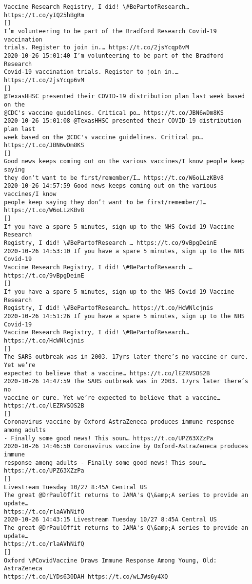 \documentclass[11pt]{article}
\begin{document}
\begin{Verbatim}[commandchars=\\\{\}]
Vaccine Research Registry, I did! \#BePartofResearch… https://t.co/yIQ25hBgRm
[]
I’m volunteering to be part of the Bradford Research Covid-19 vaccination
trials. Register to join in.… https://t.co/2jsYcqp6vM
2020-10-26 15:01:40 I’m volunteering to be part of the Bradford Research
Covid-19 vaccination trials. Register to join in.… https://t.co/2jsYcqp6vM
[]
@TexasHHSC presented their COVID-19 distribution plan last week based on the
@CDC's vaccine guidelines. Critical po… https://t.co/JBN6wDm8KS
2020-10-26 15:01:08 @TexasHHSC presented their COVID-19 distribution plan last
week based on the @CDC's vaccine guidelines. Critical po…
https://t.co/JBN6wDm8KS
[]
Good news keeps coming out on the various vaccines/I know people keep saying
they don’t want to be first/remember/I… https://t.co/W6oLLzKBv8
2020-10-26 14:57:59 Good news keeps coming out on the various vaccines/I know
people keep saying they don’t want to be first/remember/I…
https://t.co/W6oLLzKBv8
[]
If you have a spare 5 minutes, sign up to the NHS Covid-19 Vaccine Research
Registry, I did! \#BePartofResearch … https://t.co/9vBpgDeinE
2020-10-26 14:53:10 If you have a spare 5 minutes, sign up to the NHS Covid-19
Vaccine Research Registry, I did! \#BePartofResearch … https://t.co/9vBpgDeinE
[]
If you have a spare 5 minutes, sign up to the NHS Covid-19 Vaccine Research
Registry, I did! \#BePartofResearch… https://t.co/HcWNlcjnis
2020-10-26 14:51:26 If you have a spare 5 minutes, sign up to the NHS Covid-19
Vaccine Research Registry, I did! \#BePartofResearch… https://t.co/HcWNlcjnis
[]
The SARS outbreak was in 2003. 17yrs later there’s no vaccine or cure. Yet we’re
expected to believe that a vaccine… https://t.co/lEZRVSOS2B
2020-10-26 14:47:59 The SARS outbreak was in 2003. 17yrs later there’s no
vaccine or cure. Yet we’re expected to believe that a vaccine…
https://t.co/lEZRVSOS2B
[]
Coronavirus vaccine by Oxford-AstraZeneca produces immune response among adults
- Finally some good news! This soun… https://t.co/UPZ63XZzPa
2020-10-26 14:46:50 Coronavirus vaccine by Oxford-AstraZeneca produces immune
response among adults - Finally some good news! This soun…
https://t.co/UPZ63XZzPa
[]
Livestream Tuesday 10/27 8:45A Central US
The great @DrPaulOffit returns to JAMA's Q\&amp;A series to provide an update…
https://t.co/rlaAVhNifQ
2020-10-26 14:43:15 Livestream Tuesday 10/27 8:45A Central US
The great @DrPaulOffit returns to JAMA's Q\&amp;A series to provide an update…
https://t.co/rlaAVhNifQ
[]
Oxford \#CovidVaccine Draws Immune Response Among Young, Old: AstraZeneca
https://t.co/LYDs630DAH https://t.co/wLJWs6y4XQ

\end{Verbatim}
\end{document}
